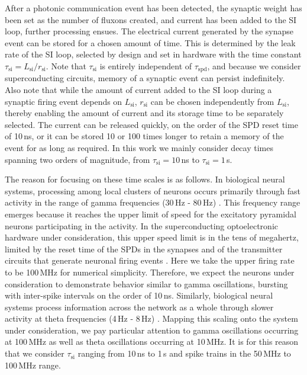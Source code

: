 \documentclass[twocolumn]{article}
\begin{document}
After a photonic communication event has been detected, the synaptic weight has been set as the number of fluxons created, and current has been added to the SI loop, further processing ensues. The electrical current generated by the synapse event can be stored for a chosen amount of time. This is determined by the leak rate of the SI loop, selected by design and set in hardware with the time constant $\tau_{\mathrm{si}} = L_{\mathrm{si}}/r_{\mathrm{si}}$. Note that $\tau_{\mathrm{si}}$ is entirely independent of $\tau_{\mathrm{spd}}$, and because we consider superconducting circuits, memory of a synaptic event can persist indefinitely. Also note that while the amount of current added to the SI loop during a synaptic firing event depends on $L_{\mathrm{si}}$, $r_{\mathrm{si}}$ can be chosen independently from $L_{\mathrm{si}}$, thereby enabling the amount of current and its storage time to be separately selected. The current can be released quickly, on the order of the SPD reset time of 10\,ns, or it can be stored 10 or 100 times longer to retain a memory of the event for as long as required. In this work we mainly consider decay times spanning two orders of magnitude, from $\tau_{\mathrm{si}} = 10$\,ns to $\tau_{\mathrm{si}} = 1$\,\textmu s. 

The reason for focusing on these time scales is as follows. In biological neural systems, processing among local clusters of neurons occurs primarily through fast activity in the range of gamma frequencies (30\,Hz - 80\,Hz) \cite{budr2004,bu2006}. This frequency range emerges because it reaches the upper limit of speed for the excitatory pyramidal neurons participating in the activity. In the superconducting optoelectronic hardware under consideration, this upper speed limit is in the tens of megahertz, limited by the reset time of the SPDs in the synapses and of the transmitter circuits that generate neuronal firing events \cite{sh2018_full}. Here we take the upper firing rate to be 100\,MHz for numerical simplicity. Therefore, we expect the neurons under consideration to demonstrate behavior similar to gamma oscillations, bursting with inter-spike intervals on the order of 10\,ns. Similarly, biological neural systems process information across the network as a whole through slower activity at theta frequencies (4\,Hz - 8\,Hz) \cite{budr2004,bu2006}. Mapping this scaling onto the system under consideration, we pay particular attention to gamma oscillations occurring at 100\,MHz as well as theta oscillations occurring at 10\,MHz. It is for this reason that we consider $\tau_{\mathrm{si}}$ ranging from 10\,ns to 1\,\textmu s and spike trains in the 50\,MHz to 100\,MHz range. 
\end{document}
